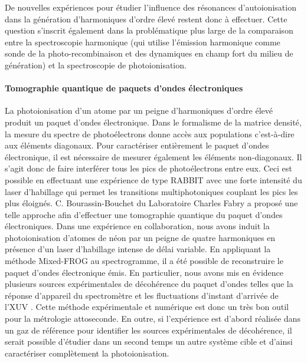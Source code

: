 De nouvelles expériences pour étudier l'influence des résonances d'autoionisation dans la génération d'harmoniques d'ordre élevé restent donc à effectuer. Cette question s'inscrit également dans la problématique plus large de la comparaison entre la spectroscopie harmonique (qui utilise l'émission harmonique comme sonde de la photo-recombinaison et des dynamiques en champ fort du milieu de génération) et la spectroscopie de photoionisation.

\paragraph*{Tomographie quantique de paquets d'ondes électroniques} La photoionisation d'un atome par un peigne d'harmoniques d'ordre élevé produit un paquet d'ondes électronique. Dans le formalisme de la matrice densité, la mesure du spectre de photoélectrons donne accès aux populations c'est-à-dire aux éléments diagonaux. Pour caractériser entièrement le paquet d'ondes électronique, il est nécessaire de mesurer également les éléments non-diagonaux. Il s'agit donc de faire interférer tous les pics de photoélectrons entre eux. Ceci est possible en effectuant une expérience de type RABBIT avec une forte intensité du laser d'habillage qui permet les transitions multiphotoniques couplant les pics les plus éloignés. C. Bourassin-Bouchet du Laboratoire Charles Fabry a proposé une telle approche afin d'effectuer une tomographie quantique du paquet d'ondes électroniques. Dans une expérience en collaboration, nous avons induit la photoionisation d'atomes de néon par un peigne de quatre harmoniques en présence d'un laser d'habillage intense de délai variable. En appliquant la méthode Mixed-FROG  au spectrogramme, il a été possible de reconstruire le paquet d'ondes électronique émis. En particulier, nous avons mis en évidence plusieurs sources expérimentales de décohérence du paquet d'ondes telles que la réponse d'appareil du spectromètre et les fluctuations d'instant d'arrivée de l'XUV . Cette méthode expérimentale et numérique est donc un très bon outil pour la métrologie attoseconde. En outre, si l'expérience est d'abord réalisée dans un gaz de référence pour identifier les sources expérimentales de décohérence, il serait possible d'étudier dans un second temps un autre système cible et d'ainsi caractériser complètement la photoionisation.






